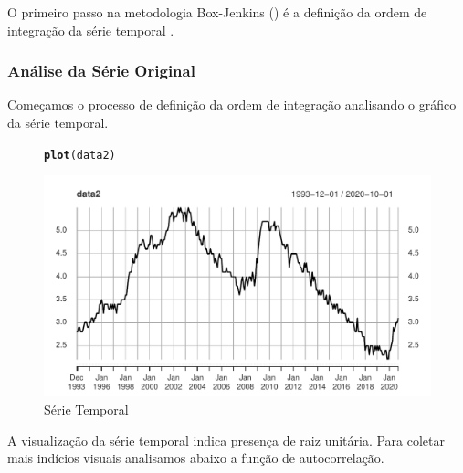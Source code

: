 \documentclass{article}\usepackage[]{graphicx}\usepackage[]{color}
\makeatletter
\def\maxwidth{ %
  \ifdim\Gin@nat@width>\linewidth
    \linewidth
  \else
    \Gin@nat@width
  \fi
}
\newcommand{\hlstd}[1]{\textcolor[rgb]{0.345,0.345,0.345}{#1}}%
\newcommand{\hlkwd}[1]{\textcolor[rgb]{0.737,0.353,0.396}{\textbf{#1}}}%
\newenvironment{kframe}{%
 \def\at@end@of@kframe{}%
 \ifinner\ifhmode%
  \def\at@end@of@kframe{\end{minipage}}%
  \begin{minipage}{\columnwidth}%
 \fi\fi%
 \def\FrameCommand##1{\hskip\@totalleftmargin \hskip-\fboxsep
 \colorbox{shadecolor}{##1}\hskip-\fboxsep
     \hskip-\linewidth \hskip-\@totalleftmargin \hskip\columnwidth}%
 \MakeFramed {\advance\hsize-\width
   \@totalleftmargin\z@ \linewidth\hsize
   \@setminipage}}%
 {\par\unskip\endMakeFramed%
 \at@end@of@kframe}
\newenvironment{knitrout}{}{} %
\makeatother
\begin{document}
        O primeiro passo na metodologia Box-Jenkins (\cite{boxjenkins}) é a definição da ordem de integração da série temporal .
    
        \subsubsection{Análise da Série Original}
        
            Começamos o processo de definição da ordem de integração analisando o gráfico da série temporal.
        
            \begin{figure}[H]
            \caption{Série Temporal}
            \centering
\begin{knitrout}
\color{fgcolor}\begin{kframe}
\begin{alltt}
\hlkwd{plot}\hlstd{(data2)}
\end{alltt}
\end{kframe}
\includegraphics[width=\maxwidth]{figure/unnamed-chunk-75-1} 

\end{knitrout}
            \end{figure}
            
            A visualização da série temporal indica presença de raiz unitária. Para coletar mais indícios visuais analisamos abaixo a função de autocorrelação.
            
\end{document}
